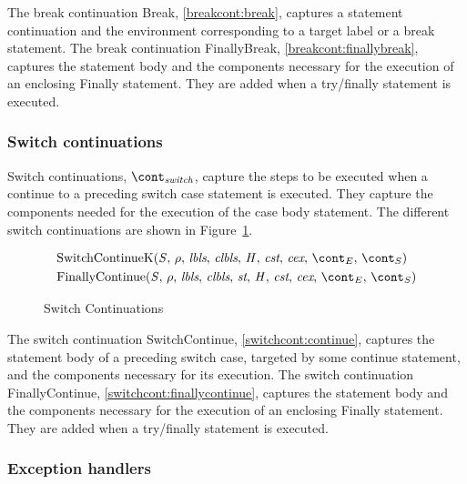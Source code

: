 \documentclass[a4paper,oneside]{article}
\begin{document}
The break continuation Break, \ref{breakcont:break}, captures a statement continuation and the environment corresponding to a target label or a break statement.
The break continuation FinallyBreak, \ref{breakcont:finallybreak}, captures the statement body and the components necessary for the execution of an enclosing Finally statement.
They are added when a try/finally statement is executed.


\subsubsection{Switch continuations}
\label{subsubsec:switch-continuations}

Switch continuations, $\switchcont$, capture the steps to be executed when a continue to a preceding switch case statement is executed.
They capture the components needed for the execution of the case body statement.
The different switch continuations are shown in Figure~\ref{figure:switchconts}.

\newcommand{\ContinueK}{\mathrm{SwitchContinueK}(\stmt,\,\env,\,\lbls,\,\clbls,\,\handler,\,\cstrace,\,\cex,\,\econt,\,\scont)}
\newcommand{\FinallyContinue}[2]{\mathrm{FinallyContinue}({#1},\,\env,\,\lbls,\,\clbls,\,\strace,\,\handler,\,\cstrace,\,\cex,\,\econt,\,{#2})}

\begin{figure}[Htp]
  \begin{eqfigure}
  \begin{align}
    &\ContinueK \label{switchcont:continue} \\
    &\FinallyContinue{\stmt}{\scont} \label{switchcont:finallycontinue}
  \end{align}
  \caption{Switch Continuations}
  \label{figure:switchconts}
  \end{eqfigure}
\end{figure}

The switch continuation SwitchContinue, \ref{switchcont:continue}, captures the statement body of a preceding switch case, targeted by some continue statement, and the components necessary for its execution.
The switch continuation FinallyContinue, \ref{switchcont:finallycontinue}, captures the statement body and the components necessary for the execution of an enclosing Finally statement.
They are added when a try/finally statement is executed.


\subsubsection{Exception handlers}
\label{subsubsec:exception-handlers}
\end{document}
